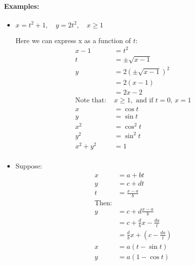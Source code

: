 \documentclass[\pointsize, letterpaper]{article}
\begin{document}
    \paragraph*{Examples:}
    \begin{itemize}
        \item $x = t^{2} + 1, \quad y = 2t^{2}, \quad x \geq 1$
        
        Here we can express x as a function of $t$:
        \begin{align*}
            x-1 & = t^{2}                   \\
            t   & = \pm\sqrt{x-1}           \\
            y   & = 2(\pm\sqrt{x-1})^{2}    \\
                & = 2(x-1)                  \\
                & = 2x-2                    \\
            \text{Note that: } & x \geq 1, 
            \text{ and if } t = 0, \, x = 1 \\
            x   & = \cos t                  \\
            y   & = \sin t                  \\
            x^{2}   & = \cos^{2} t          \\
            y^{2}   & = \sin^{2} t          \\
            x^{2} + y^{2} & = 1             \\
        \end{align*}

        \item Suppose:
        \begin{align*}
            x   & = a + bt          \\
            y   & = c + dt          \\
            t   & = \frac{x-a}{b}   \\
            \text{Then:} &          \\
            y   & = c + 
                    d\frac{x-a}{b}  \\
                & = c + 
                    \frac{d}{b}x - 
                    \frac{da}{t}    \\
                & = \frac{d}{b}x + 
                    \left(
                        c - \frac{da}{t}
                    \right)         \\
            x   & = a(t-\sin t)     \\
            y   & = a(1 - \cos t)   \\
        \end{align*}
    \end{itemize}
\end{document}
